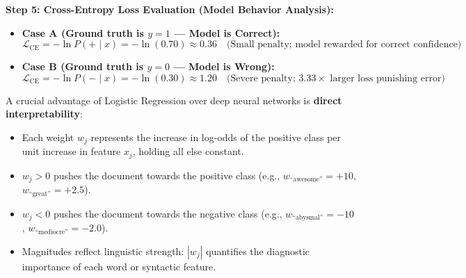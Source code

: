 \documentclass[10pt,a4paper]{article}
\begin{document}
\begin{examplebox}
\vspace{2pt}
\noindent\textbf{Step 5: Cross-Entropy Loss Evaluation (Model Behavior Analysis):}
\begin{itemize}[leftmargin=12pt, itemsep=0.5pt, parsep=0pt]
    \item \textbf{Case A (Ground truth is $y = 1$ --- Model is Correct):}
    $$\mathcal{L}_{\text{CE}} = -\ln P(+ \mid x) = -\ln(0.70) \approx \mathbf{0.36} \quad \text{(Small penalty; model rewarded for correct confidence)}$$
    \item \textbf{Case B (Ground truth is $y = 0$ --- Model is Wrong):}
    $$\mathcal{L}_{\text{CE}} = -\ln P(- \mid x) = -\ln(0.30) \approx \mathbf{1.20} \quad \text{(Severe penalty; $\mathbf{3.33\times}$ larger loss punishing error)}$$
\end{itemize}
\end{examplebox}
\vspace{2pt}

\par\vspace{1pt}
A crucial advantage of Logistic Regression over deep neural networks is \textbf{direct interpretability}:
\begin{itemize}[leftmargin=12pt, itemsep=0.5pt, parsep=0pt, topsep=0.5pt]
    \item Each weight $w_j$ represents the increase in log-odds of the positive class per unit increase in feature $x_j$, holding all else constant.
    \item $w_j > 0$ pushes the document towards the positive class (e.g., $w_{\text{``awesome''}} = +10$, $w_{\text{``great''}} = +2.5$).
    \item $w_j < 0$ pushes the document towards the negative class (e.g., $w_{\text{``abysmal''}} = -10$, $w_{\text{``mediocre''}} = -2.0$).
    \item Magnitudes reflect linguistic strength: $|w_j|$ quantifies the diagnostic importance of each word or syntactic feature.
\end{itemize}

\newpage

\end{document}
